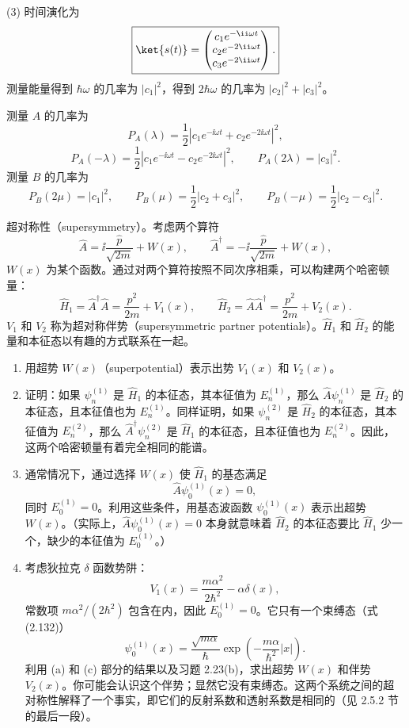 \begin{solution}
(3) 时间演化为
\[
\boxed{\ket{s(t)}=\begin{pmatrix}
c_1e^{-\ii\omega t}\\
c_2e^{-2\ii\omega t}\\
c_3e^{-2\ii\omega t}
\end{pmatrix}.}
\]
测量能量得到 $\hbar\omega$ 的几率为 $|c_1|^2$，得到 $2\hbar\omega$ 的几率为 $|c_2|^2+|c_3|^2$。

测量 $A$ 的几率为
\[
P_A(\lambda)=\frac12\left|c_1e^{-\ii\omega t}+c_2e^{-2\ii\omega t}\right|^2,
\]
\[
P_A(-\lambda)=\frac12\left|c_1e^{-\ii\omega t}-c_2e^{-2\ii\omega t}\right|^2,
\qquad
P_A(2\lambda)=|c_3|^2.
\]
测量 $B$ 的几率为
\[
P_B(2\mu)=|c_1|^2,
\qquad
P_B(\mu)=\frac12|c_2+c_3|^2,
\qquad
P_B(-\mu)=\frac12|c_2-c_3|^2.
\]
\end{solution}

\begin{question}
超对称性（supersymmetry）。考虑两个算符
\[
\hat A=\ii\frac{\hat p}{\sqrt{2m}}+W(x),
\qquad
\hat A^\dagger=-\ii\frac{\hat p}{\sqrt{2m}}+W(x),\tag{3.116}
\]
$W(x)$ 为某个函数。通过对两个算符按照不同次序相乘，可以构建两个哈密顿量：
\[
\hat H_1=\hat A^\dagger\hat A=\frac{p^2}{2m}+V_1(x),
\qquad
\hat H_2=\hat A\hat A^\dagger=\frac{p^2}{2m}+V_2(x).\tag{3.117}
\]
$V_1$ 和 $V_2$ 称为超对称伴势（supersymmetric partner potentials）。$\hat H_1$ 和 $\hat H_2$ 的能量和本征态以有趣的方式联系在一起。
\begin{enumerate}
\item 用超势 $W(x)$（superpotential）表示出势 $V_1(x)$ 和 $V_2(x)$。
\item 证明：如果 $\psi_n^{(1)}$ 是 $\hat H_1$ 的本征态，其本征值为 $E_n^{(1)}$，那么 $\hat A\psi_n^{(1)}$ 是 $\hat H_2$ 的本征态，且本征值也为 $E_n^{(1)}$。同样证明，如果 $\psi_n^{(2)}$ 是 $\hat H_2$ 的本征态，其本征值为 $E_n^{(2)}$，那么 $\hat A^\dagger\psi_n^{(2)}$ 是 $\hat H_1$ 的本征态，且本征值也为 $E_n^{(2)}$。因此，这两个哈密顿量有着完全相同的能谱。
\item 通常情况下，通过选择 $W(x)$ 使 $\hat H_1$ 的基态满足
\[
\hat A\psi_0^{(1)}(x)=0,\tag{3.118}
\]
同时 $E_0^{(1)}=0$。利用这些条件，用基态波函数 $\psi_0^{(1)}(x)$ 表示出超势 $W(x)$。（实际上，$\hat A\psi_0^{(1)}(x)=0$ 本身就意味着 $\hat H_2$ 的本征态要比 $\hat H_1$ 少一个，缺少的本征值为 $E_0^{(1)}$。）
\item 考虑狄拉克 $\delta$ 函数势阱：
\[
V_1(x)=\frac{m\alpha^2}{2\hbar^2}-\alpha\delta(x),\tag{3.119}
\]
常数项 $m\alpha^2/(2\hbar^2)$ 包含在内，因此 $E_0^{(1)}=0$。它只有一个束缚态（式 (2.132)）
\[
\psi_0^{(1)}(x)=\frac{\sqrt{m\alpha}}{\hbar}\exp\left(-\frac{m\alpha}{\hbar^2}|x|\right).\tag{3.120}
\]
利用 (a) 和 (c) 部分的结果以及习题 2.23(b)，求出超势 $W(x)$ 和伴势 $V_2(x)$。你可能会认识这个伴势；显然它没有束缚态。这两个系统之间的超对称性解释了一个事实，即它们的反射系数和透射系数是相同的（见 2.5.2 节的最后一段）。
\end{enumerate}

\par\smallskip
{}

\end{question}
